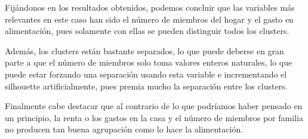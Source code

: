 Fijándonos en los resultados obtenidos, podemos concluir que las variables más relevantes en este caso han sido el número de miembros del hogar y el gasto en alimentación, pues solamente con ellas se pueden distinguir todos los clusters.

Además, los clusters están bastante separados, lo que puede deberse en gran parte a que el número de miembros solo toma valores enteros naturales, lo que puede estar forzando una separación usando esta variable e incrementando el silhouette artificialmente, pues premia mucho la separación entre los clusters.

Finalmente cabe destacar que al contrario de lo que podríamos haber pensado en un principio, la renta o los gastos en la casa y el número de miembros por familia no producen tan buena agrupación como lo hace la alimentación.





